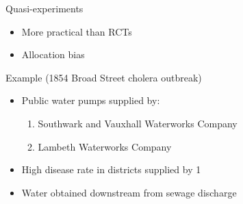\begin{frame}[t]{Quasi-experiments}
    \begin{itemize}
        \item More practical than RCTs
        \item \alert{Allocation bias}
    \end{itemize}
    \vfill
    \begin{block}{Example (1854 Broad Street cholera outbreak)}\vspace{-1ex}
        \begin{itemize}
            \item Public water pumps supplied by:
                  \begin{enumerate}
                      \item Southwark and Vauxhall Waterworks Company
                      \item Lambeth Waterworks Company
                  \end{enumerate}
            \item High disease rate in districts supplied by 1
            \item Water obtained downstream from sewage discharge
        \end{itemize}
    \end{block}
\end{frame}



